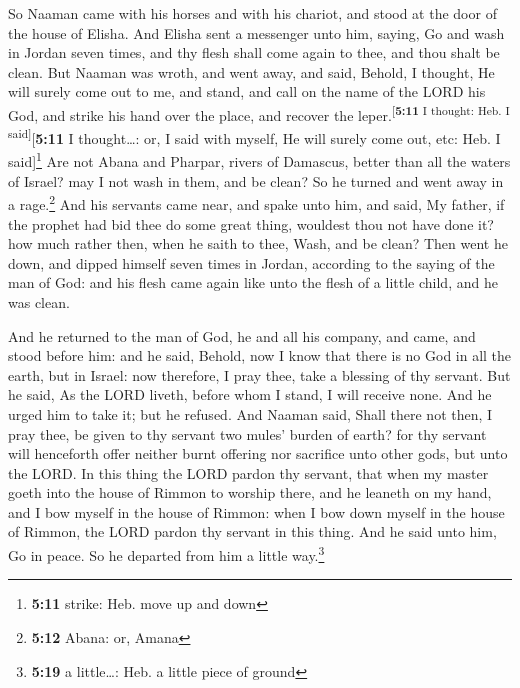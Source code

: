  So Naaman came with his horses and with his chariot, and
stood at the door of the house of Elisha.  And Elisha
sent a messenger unto him, saying, Go and wash in Jordan seven times,
and thy flesh shall come again to thee, and thou shalt be clean.
 But Naaman was wroth, and went away, and said, Behold, I
thought, He will surely come out to me, and stand, and call on the name
of the LORD his God, and strike his hand over the place, and recover the
leper.\textsuperscript{{[}\textbf{5:11} I thought: Heb. I
said{]}}{[}\textbf{5:11} I thought\ldots: or, I said with myself, He
will surely come out, etc: Heb. I said{]}\footnote{\textbf{5:11} strike:
  Heb. move up and down}  Are not Abana and Pharpar,
rivers of Damascus, better than all the waters of Israel? may I not wash
in them, and be clean? So he turned and went away in a rage.\footnote{\textbf{5:12}
  Abana: or, Amana}  And his servants came near, and
spake unto him, and said, My father, if the prophet had bid thee do some
great thing, wouldest thou not have done it? how much rather then, when
he saith to thee, Wash, and be clean?  Then went he down,
and dipped himself seven times in Jordan, according to the saying of the
man of God: and his flesh came again like unto the flesh of a little
child, and he was clean.

 And he returned to the man of God, he and all his
company, and came, and stood before him: and he said, Behold, now I know
that there is no God in all the earth, but in Israel: now therefore, I
pray thee, take a blessing of thy servant.  But he said,
As the LORD liveth, before whom I stand, I will receive none. And he
urged him to take it; but he refused.  And Naaman said,
Shall there not then, I pray thee, be given to thy servant two mules'
burden of earth? for thy servant will henceforth offer neither burnt
offering nor sacrifice unto other gods, but unto the LORD.
 In this thing the LORD pardon thy servant, that when my
master goeth into the house of Rimmon to worship there, and he leaneth
on my hand, and I bow myself in the house of Rimmon: when I bow down
myself in the house of Rimmon, the LORD pardon thy servant in this
thing.  And he said unto him, Go in peace. So he departed
from him a little way.\footnote{\textbf{5:19} a little\ldots: Heb. a
  little piece of ground}

